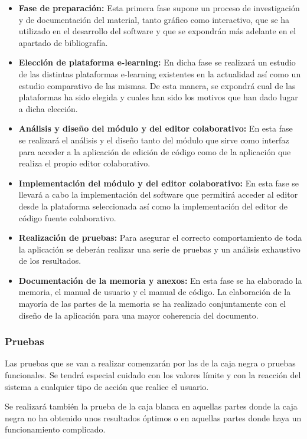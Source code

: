 \begin{itemize}
	\item \textbf{Fase de preparación:} Esta primera fase supone un proceso de investigación y de documentación del material, tanto gráfico como interactivo, que se ha utilizado en el desarrollo del software y que se expondrán más adelante en el apartado de bibliografía.
	\item \textbf{Elección de plataforma e-learning:} En dicha fase se realizará un estudio de las distintas plataformas e-learning existentes en la actualidad así como un estudio comparativo de las mismas. De esta manera, se expondrá cual de las plataformas ha sido elegida y cuales han sido los motivos que han dado lugar a dicha elección.
	\item \textbf{Análisis y diseño del módulo y del editor colaborativo:} En esta fase se realizará el análisis y el diseño tanto del módulo que sirve como interfaz para acceder a la aplicación de edición de código como de la aplicación que realiza el propio editor colaborativo.
	\item \textbf{Implementación del módulo y del editor colaborativo:} En esta fase se llevará a cabo la implementación del software que permitirá acceder al editor desde la plataforma seleccionada así como la implementación del editor de código fuente colaborativo.
	\item \textbf{Realización de pruebas:} Para asegurar el correcto comportamiento de toda la aplicación se deberán realizar una serie de pruebas y un análisis exhaustivo de los resultados.
	\item \textbf{Documentación de la memoria y anexos:} En esta fase se ha elaborado la memoria, el manual de usuario y el manual de código. La elaboración de la mayoría de las partes de la memoria se ha realizado conjuntamente con el diseño de la aplicación para una mayor coherencia del documento.
\end{itemize}

\subsubsection{Pruebas}

Las pruebas que se van a realizar comenzarán por las de la caja negra o pruebas funcionales. Se tendrá especial cuidado con los valores límite y con la reacción del sistema a cualquier tipo de acción que realice el usuario.

Se realizará también la prueba de la caja blanca en aquellas partes donde la caja negra no ha obtenido unos resultados óptimos o en aquellas partes donde haya un funcionamiento complicado.

